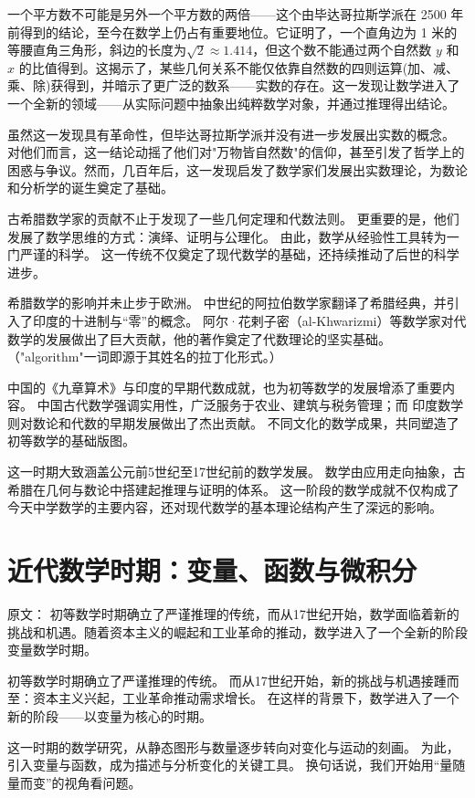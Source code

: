 一个平方数不可能是另外一个平方数的两倍——这个由毕达哥拉斯学派在 2500 年前得到的结论，至今在数学上仍占有重要地位。它证明了，一个直角边为 1 米的等腰直角三角形，斜边的长度为$\sqrt{2}\approx1.414$，但这个数不能通过两个自然数 $y$ 和 $x$ 的比值得到。这揭示了，某些几何关系不能仅依靠自然数的四则运算(加、减、乘、除)获得到，并暗示了更广泛的数系——实数的存在。这一发现让数学进入了一个全新的领域——从实际问题中抽象出纯粹数学对象，并通过推理得出结论。

虽然这一发现具有革命性，但毕达哥拉斯学派并没有进一步发展出实数的概念。
对他们而言，这一结论动摇了他们对"万物皆自然数"的信仰，甚至引发了哲学上的困惑与争议。然而，几百年后，这一发现启发了数学家们发展出实数理论，为数论和分析学的诞生奠定了基础。

古希腊数学家的贡献不止于发现了一些几何定理和代数法则。  
更重要的是，他们发展了数学思维的方式：演绎、证明与公理化。  
由此，数学从经验性工具转为一门严谨的科学。  
这一传统不仅奠定了现代数学的基础，还持续推动了后世的科学进步。

希腊数学的影响并未止步于欧洲。  
中世纪的阿拉伯数学家翻译了希腊经典，并引入了印度的十进制与“零”的概念。  
阿尔·花剌子密（al-Khwarizmi）等数学家对代数学的发展做出了巨大贡献，他的著作奠定了代数理论的坚实基础。（"algorithm"一词即源于其姓名的拉丁化形式。）

中国的《九章算术》与印度的早期代数成就，也为初等数学的发展增添了重要内容。  
中国古代数学强调实用性，广泛服务于农业、建筑与税务管理；而 印度数学则对数论和代数的早期发展做出了杰出贡献。  
不同文化的数学成果，共同塑造了初等数学的基础版图。

这一时期大致涵盖公元前5世纪至17世纪前的数学发展。 数学由应用走向抽象，古希腊在几何与数论中搭建起推理与证明的体系。  
这一阶段的数学成就不仅构成了今天中学数学的主要内容，还对现代数学的基本理论结构产生了深远的影响。

\section{近代数学时期：变量、函数与微积分}
原文：
初等数学时期确立了严谨推理的传统，而从17世纪开始，数学面临着新的挑战和机遇。随着资本主义的崛起和工业革命的推动，数学进入了一个全新的阶段变量数学时期。

初等数学时期确立了严谨推理的传统。  
而从17世纪开始，新的挑战与机遇接踵而至：资本主义兴起，工业革命推动需求增长。  
在这样的背景下，数学进入了一个新的阶段——以变量为核心的时期。

这一时期的数学研究，从静态图形与数量逐步转向对变化与运动的刻画。  
为此，引入变量与函数，成为描述与分析变化的关键工具。  
换句话说，我们开始用“量随量而变”的视角看问题。

